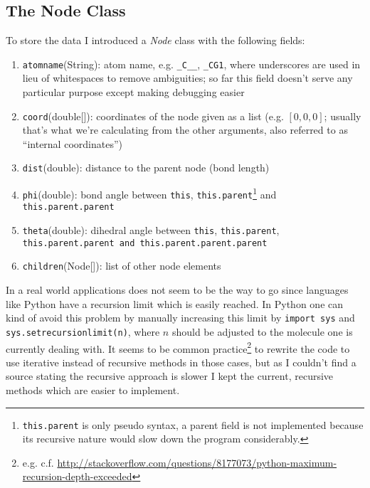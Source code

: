 \subsection{The Node Class}

To store the data I introduced a \textit{Node} class with the following fields:
\begin{enumerate}
	\item \texttt{atomname}(String): atom name, e.g. \texttt{\_C\_\_}, \texttt{\_CG1}, where underscores are used in lieu of whitespaces to remove ambiguities; so far this field doesn't serve any particular purpose except making debugging easier
	\item \texttt{coord}(double[]): coordinates of the node given as a list (e.g. $[0,0,0]$; usually that's what we're calculating from the other arguments, also referred to as ``internal coordinates'')
	\item \texttt{dist}(double): distance to the parent node (bond length)
	\item \texttt{phi}(double): bond angle between \texttt{this}, \texttt{this.parent}\footnote{\texttt{this.parent} is only pseudo syntax, a parent field is not implemented because its recursive nature would slow down the program considerably.} and \texttt{this.parent.parent}
	\item \texttt{theta}(double): dihedral angle between \texttt{this}, \texttt{this.parent}, \texttt{this.parent.parent and this.parent.parent.parent}
	\item \texttt{children}(Node[]): list of other node elements
\end{enumerate}

In a real world applications does not seem to be the way to go since languages like Python have a recursion limit which is easily reached.
In Python one can kind of avoid this problem by manually increasing this limit by \texttt{import sys} and \texttt{sys.setrecursionlimit(n)}, where $n$ should be adjusted to the molecule one is currently dealing with.
It seems to be common practice\footnote{e.g. c.f. \url{http://stackoverflow.com/questions/8177073/python-maximum-recursion-depth-exceeded}} to rewrite the code to use iterative instead of recursive methods in those cases, but as I couldn't find a source stating the recursive approach is slower I kept the current, recursive methods which are easier to implement.

